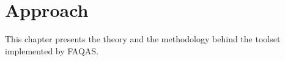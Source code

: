 
\chapter{Approach}
\label{chapter:approach}

This chapter presents the theory and the methodology behind the toolset implemented by FAQAS.







